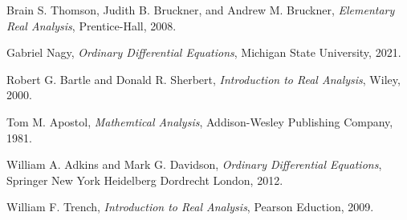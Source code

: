 \documentclass{arabicClass}
\begin{document}
	\abovedisplayskip=7pt
	\belowdisplayskip=7pt
	
	
	
	
	\tableofcontents
	\clearpage
	
	
	
	
		
	
	\begin{thebibliography}{99}

	
	\begin{english}
		Brain S. Thomson, Judith B. Bruckner, and Andrew M. Bruckner, \emph{Elementary Real Analysis}, Prentice-Hall, 2008.
		
		Gabriel Nagy, \emph{Ordinary Differential Equations}, Michigan State University, 2021.

        Robert G. Bartle and Donald R. Sherbert, \emph{Introduction to Real Analysis}, Wiley, 2000.		
		
		Tom M. Apostol, \emph{Mathemtical Analysis}, Addison-Wesley Publishing Company, 1981.
		
		William A. Adkins and Mark G. Davidson, \emph{Ordinary Differential Equations}, Springer New York Heidelberg Dordrecht London, 2012.
		
		William F. Trench, \emph{Introduction to Real Analysis}, Pearson Eduction, 2009.
		
		
		
			\end{english}
	\end{thebibliography}
\end{document}
